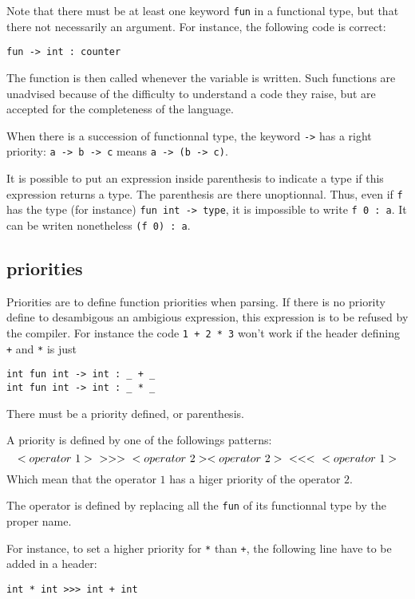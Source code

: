 \documentclass{article}
\begin{document}
Note that there must be at least one keyword \lstinline$fun$ in a functional type, but that there not necessarily an argument.
For instance, the following code is correct:
\begin{lstlisting}
fun -> int : counter
\end{lstlisting}
The function is then called whenever the variable is written.
Such functions are unadvised because of the difficulty to understand a code they raise, but are accepted for the completeness of the language.

When there is a succession of functionnal type, the keyword \lstinline$->$ has a right priority: \lstinline$a -> b -> c$ means \lstinline$a -> (b -> c)$.

It is possible to put an expression inside parenthesis to indicate a type if this expression returns a type. The parenthesis are there unoptionnal.
Thus, even if \lstinline$f$ has the type (for instance) \lstinline$fun int -> type$, it is impossible to write \lstinline$f 0 : a$.
It can be writen nonetheless \lstinline$(f 0) : a$.

\subsection{priorities}

Priorities are to define function priorities when parsing.
If there is no priority define to desambigous an ambigious expression, this expression is to be refused by the compiler.
For instance the code \lstinline$1 + 2 * 3$ won’t work if the header defining \lstinline$+$ and \lstinline$*$ is just
\begin{lstlisting}
int fun int -> int : _ + _
int fun int -> int : _ * _
\end{lstlisting}
There must be a priority defined, or parenthesis.

A priority is defined by one of the followings patterns:
\[
    <operator~1>~\textrm{\lstinline$>>>$}~<operator~2>
    <operator~2>~\textrm{\lstinline$<<<$}~<operator~1>
\]
Which mean that the operator $1$ has a higer priority of the operator $2$.

The operator is defined by replacing all the \lstinline$fun$ of its functionnal type by the proper name.

For instance, to set a higher priority for \lstinline$*$ than \lstinline$+$, the following line have to be added in a header:
\begin{lstlisting}
int * int >>> int + int
\end{lstlisting}
\end{document}
